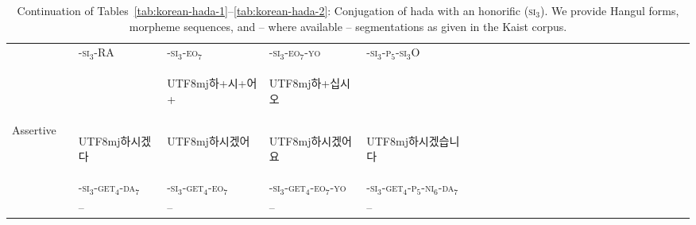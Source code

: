 \documentclass[11pt,letterpaper]{article}
\newcommand{\korean}[1]{\begin{CJK}{UTF8}{mj}#1\end{CJK}}
\begin{document}
\begin{table}[]
\begin{tabular}{llllllllllllllllllllllllll}
&& -\textsc{si}$_3$-RA & -\textsc{si}$_3$-\textsc{eo}$_7$ & -\textsc{si}$_3$-\textsc{eo}$_7$-\textsc{yo} & -\textsc{si}$_3$-\textsc{p}$_5$-\textsc{si}$_3$O \\
&        &      & \korean{하+시+어+}               &   \korean{하+십시오}       \\
\hline
\multirow{2}{*}{Assertive} & & \korean{하시겠다} & \korean{하시겠어} & \korean{하시겠어요} & \korean{하시겠습니다} \\
&        &  -\textsc{si}$_3$-\textsc{get}$_4$-\textsc{da}$_7$     &  -\textsc{si}$_3$-\textsc{get}$_4$-\textsc{eo}$_7$              &  -\textsc{si}$_3$-\textsc{get}$_4$-\textsc{eo}$_7$-\textsc{yo} & -\textsc{si}$_3$-\textsc{get}$_4$-\textsc{p}$_5$-\textsc{ni}$_6$-\textsc{da}$_7$        \\
&& -- & -- & -- & -- \\
    \end{tabular}
    \caption{Continuation of Tables~\ref{tab:korean-hada-1}--\ref{tab:korean-hada-2}: Conjugation of hada with an honorific (\textsc{si}$_3$). We provide Hangul forms, morpheme sequences, and -- where available -- segmentations as given in the Kaist corpus.}
    \label{tab:korean-hada-3}
\end{table}

\end{document}
